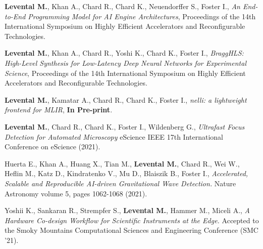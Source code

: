 \documentclass[11pt,letterpaper,roman,colorlinks,linkcolor=blue]{moderncv}
\begin{document}
\begin{hangingpar}
\textbf{Levental M.}, Khan A., Chard R., Chard K., Neuendorffer S., Foster I.,
\textit{An End-to-End Programming Model for AI Engine Architectures},
Proceedings of the 14th International Symposium on Highly Efficient Accelerators and Reconfigurable Technologies.
\end{hangingpar}

\begin{hangingpar}
\textbf{Levental M.}, Khan A., Chard R., Yoshi K., Chard K., Foster I.,
\textit{BraggHLS: High-Level Synthesis for Low-Latency Deep Neural Networks for Experimental Science},
Proceedings of the 14th International Symposium on Highly Efficient Accelerators and Reconfigurable Technologies.
\end{hangingpar}

\begin{hangingpar}
\textbf{Levental M.}, Kamatar A., Chard R., Chard K., Foster I.,
\textit{nelli: a lightweight frontend for MLIR},
\textbf{In Pre-print}.
\end{hangingpar}

\begin{hangingpar}
\textbf{Levental M.}, Chard R., Chard K., Foster I., Wildenberg G.,
\textit{Ultrafast Focus Detection for Automated Microscopy} 
eScience IEEE 17th International Conference on eScience (2021).
\end{hangingpar}


\begin{hangingpar}
Huerta E., Khan A., Huang X., Tian M., \textbf{Levental M.}, Chard R., Wei W., Heflin M., Katz D., Kindratenko V., Mu D., Blaiszik B., Foster I.,
\textit{Accelerated, Scalable and Reproducible AI-driven Gravitational Wave Detection.} 
Nature Astronomy volume 5, pages 1062-1068 (2021).
\end{hangingpar}

\begin{hangingpar}
Yoshii K., Sankaran R., Strempfer S., \textbf{Levental M.}, Hammer M., Miceli A.,
\textit{A Hardware Co-design Workflow for Scientific Instruments at the Edge.} 
Accepted to the Smoky Mountains Computational Sciences and Engineering Conference (SMC '21).
\end{hangingpar}
\end{document}
